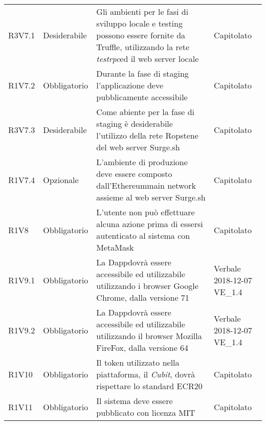 \begin{center}
\begin{longtable}{ >{\centering}p{} >{\centering}p{}
			>{\raggedright}p{} >{\centering}p{}}
		R3V7.1	&	Desiderabile	&	Gli ambienti per le fasi di sviluppo locale e testing possono essere fornite da Truffle\glo, utilizzando la rete \textit{testrpc}\glosp ed il web server locale	&	Capitolato	\tabularnewline
		R1V7.2	&	Obbligatorio	&	Durante la fase di staging l'applicazione deve pubblicamente accessibile	&	Capitolato	\tabularnewline
		R3V7.3	&	Desiderabile	&	Come abiente per la fase di staging è desiderabile l'utilizzo della rete Ropsten\glosp e del web server Surge.sh	&	Capitolato	\tabularnewline
		R1V7.4	&	Opzionale	&	L'ambiente di produzione deve essere composto dall'Ethereum\glosp main network assieme al web server Surge.sh	&	Capitolato	\tabularnewline
		R1V8	&	Obbligatorio	&	L'utente non può effettuare alcuna azione prima di essersi autenticato al sistema con MetaMask\glo	&	Capitolato	\tabularnewline
		R1V9.1	&	Obbligatorio	&	La Dapp\glosp dovrà essere accessibile ed utilizzabile utilizzando i browser Google Chrome, dalla versione 71	&	Verbale 2018-12-07  VE\_1.4	\tabularnewline
		R1V9.2	&	Obbligatorio	&	La Dapp\glosp dovrà essere accessibile ed utilizzabile utilizzando il browser Mozilla FireFox, dalla versione 64	&	Verbale 2018-12-07 VE\_1.4	\tabularnewline
		R1V10	&	Obbligatorio	&	Il token utilizzato nella piattaforma, il \textit{Cubit}\glo, dovrà rispettare lo standard ECR20\glo	&	Capitolato	\tabularnewline
		R1V11	&	Obbligatorio	&	Il sistema deve essere pubblicato con licenza MIT	&	Capitolato	\tabularnewline
		
		
		
		
	\end{longtable}
\end{center}

